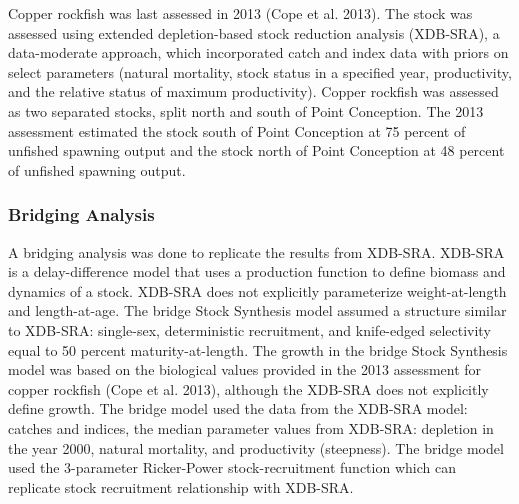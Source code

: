 \documentclass[11pt,
  english,
  a4paper,
]{article}
\begin{document}
\leavevmode\tagmcend\tagstructend


Copper rockfish was last assessed in 2013 {(Cope et al. 2013)\leavevmode\tagmcend\tagstructend}. The stock was assessed using extended depletion-based stock reduction analysis (XDB-SRA), a data-moderate approach, which incorporated catch and index data with priors on select parameters (natural mortality, stock status in a specified year, productivity, and the relative status of maximum productivity). Copper rockfish was assessed as two separated stocks, split north and south of Point Conception. The 2013 assessment estimated the stock south of Point Conception at 75 percent of unfished spawning output and the stock north of Point Conception at 48 percent of unfished spawning output.

\leavevmode\tagmcend\tagstructend\par


\hypertarget{bridging-analysis}{%
\subsubsection{Bridging Analysis}\label{bridging-analysis}}

\leavevmode\tagmcend\tagstructend


A bridging analysis was done to replicate the results from XDB-SRA. XDB-SRA is a delay-difference model that uses a production function to define biomass and dynamics of a stock. XDB-SRA does not explicitly parameterize weight-at-length and length-at-age. The bridge Stock Synthesis model assumed a structure similar to XDB-SRA: single-sex, deterministic recruitment, and knife-edged selectivity equal to 50 percent maturity-at-length. The growth in the bridge Stock Synthesis model was based on the biological values provided in the 2013 assessment for copper rockfish {(Cope et al. 2013)\leavevmode\tagmcend\tagstructend}, although the XDB-SRA does not explicitly define growth. The bridge model used the data from the XDB-SRA model: catches and indices, the median parameter values from XDB-SRA: depletion in the year 2000, natural mortality, and productivity (steepness). The bridge model used the 3-parameter Ricker-Power stock-recruitment function which can replicate stock recruitment relationship with XDB-SRA.
\end{document}

